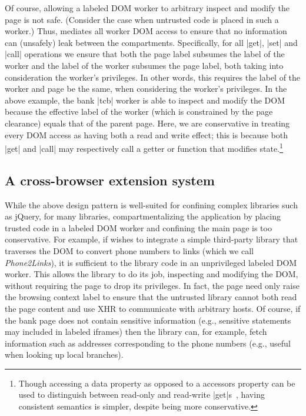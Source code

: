 Of course, allowing a labeled DOM worker to arbitrary inspect and
modify the page is not safe.
%
(Consider the case when untrusted code is placed in such a worker.)
%
Thus, \sys{} mediates all worker DOM access to ensure that no information can
(unsafely) leak between the compartments.
%
Specifically, for all \js|get|, \js|set| and \js|call| operations we
ensure that both the page label subsumes the label of the worker 
and the label of the worker subsumes the page label,
both taking into consideration the worker's privileges.
%
In other words, this requires the label of the worker and page be the same,
when considering the worker's privileges.
%
In the above example, the bank \js|tcb| worker is able to inspect and modify
the DOM because the effective label of the worker (which is constrained by the
page clearance) equals that of the parent page.
%
Here, we are conservative in treating every DOM access as
having both a read and write effect;
%
this is because both \js|get| and \js|call| may respectively call a getter or
function that modifies state.\footnote{
Though accessing a data property as opposed to a accessors property
can be used to distinguish between read-only and read-write
\js|get|s~\cite{ecma}, having consistent semantics is simpler,
despite being more conservative.
}
%


\subsection{A cross-browser extension system}
\label{sec:system:extension}

While the above design pattern is well-suited for confining complex libraries
such as jQuery, for many libraries, compartmentalizing the application by
placing trusted code in a labeled DOM worker and confining the main page is too
conservative.
%
For example, if  wishes to integrate a simple
third-party library that traverses the DOM to convert phone numbers to
links (which we call \emph{Phone2Links}), it is sufficient to the library
code in an unprivileged labeled DOM worker.
%
This allows the library to do its job, inspecting and modifying the DOM,
without requiring the page to drop its privileges.
%
In fact, the page need only raise the browsing context label to ensure that the
untrusted library cannot both read the page content and use XHR to communicate
with arbitrary hosts.
%
Of course, if the bank page does not contain sensitive information (e.g.,
sensitive statements may included in labeled iframes) then the library can, for
example, fetch information such as addresses corresponding to the phone
numbers (e.g., useful when looking up local branches).

